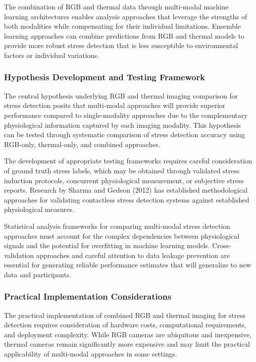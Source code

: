 \documentclass[11pt,a4paper]{article}
\begin{document}
The combination of RGB and thermal data through multi-modal machine learning architectures enables analysis approaches
that leverage the strengths of both modalities while compensating for their individual limitations. Ensemble learning
approaches can combine predictions from RGB and thermal models to provide more robust stress detection that is less
susceptible to environmental factors or individual variations.

\subsubsection{Hypothesis Development and Testing Framework}

The central hypothesis underlying RGB and thermal imaging comparison for stress detection posits that multi-modal
approaches will provide superior performance compared to single-modality approaches due to the complementary
physiological information captured by each imaging modality. This hypothesis can be tested through systematic comparison
of stress detection accuracy using RGB-only, thermal-only, and combined approaches.

The development of appropriate testing frameworks requires careful consideration of ground truth stress labels, which
may be obtained through validated stress induction protocols, concurrent physiological measurement, or subjective stress
reports. Research by Sharma and Gedeon (2012) has established methodological approaches for validating contactless
stress detection systems against established physiological measures.

Statistical analysis frameworks for comparing multi-modal stress detection approaches must account for the complex
dependencies between physiological signals and the potential for overfitting in machine learning models.
Cross-validation approaches and careful attention to data leakage prevention are essential for generating reliable
performance estimates that will generalize to new data and participants.

\subsubsection{Practical Implementation Considerations}

The practical implementation of combined RGB and thermal imaging for stress detection requires consideration of hardware
costs, computational requirements, and deployment complexity. While RGB cameras are ubiquitous and inexpensive, thermal
cameras remain significantly more expensive and may limit the practical applicability of multi-modal approaches in some
settings.
\end{document}
